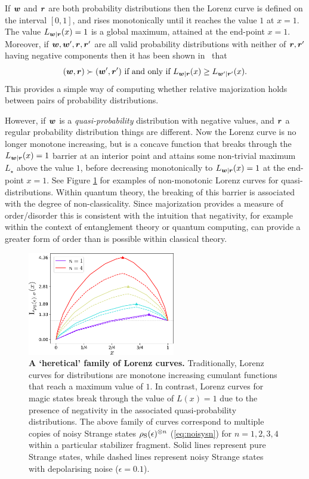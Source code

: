 \documentclass[pra,
aps,
twocolumn,
superscriptaddress,
groupedaddress,
nofootinbib,
reprint
]{revtex4-1}
\begin{document}
If $\boldsymbol{w}$ and $\boldsymbol{r}$ are both probability distributions then the Lorenz curve is defined on the interval $[0,1]$, and rises monotonically until it reaches the value $1$ at $x=1$. The value $L_{\boldsymbol{w}|\boldsymbol{r}}(x) = 1$ is a global maximum, attained at the end-point $x=1$. Moreover, if $\boldsymbol{w}, \boldsymbol{w}', \boldsymbol{r}, \boldsymbol{r}'$ are all valid probability distributions with neither of $\boldsymbol{r},\boldsymbol{r}'$ having negative components then it has been shown in~\cite{ruch_mixing_1978} that
\begin{equation}
(\boldsymbol{w}, \boldsymbol{r}) \succ (\boldsymbol{w}', \boldsymbol{r}') \mbox{ if and only if } L_{\boldsymbol{w} |\boldsymbol{r}}(x) \ge L_{\boldsymbol{w}' |\boldsymbol{r}'}(x).
\end{equation}
This provides a simple way of computing whether relative majorization holds between pairs of probability distributions.

However, if $\boldsymbol{w}$ is a \emph{quasi-probability} distribution with negative values, and $\boldsymbol{r}$ a regular probability distribution things are different. Now the Lorenz curve is no longer monotone increasing, but is a concave function that breaks through the $L_{\boldsymbol{w}|\boldsymbol{r}}(x) = 1$ barrier at an interior point and attains some non-trivial maximum $L_\star$ above the value $1$, before decreasing monotonically to $L_{\boldsymbol{w}|\boldsymbol{r}}(x)= 1$ at the end-point $x=1$. See Figure \ref{fig:lcs} for examples of non-monotonic Lorenz curves for quasi-distributions. Within quantum theory, the breaking of this barrier is associated with the degree of non-classicality. Since majorization provides a measure of order/disorder this is consistent with the intuition that negativity, for example within the context of entanglement theory or quantum computing, can provide a greater form of order than is possible within classical theory.

\begin{figure}
    \centering
    \includegraphics[height=4.5cm]{figs/lc_Strange.pdf}
    \caption{\textbf{A `heretical' family of Lorenz curves.} Traditionally, Lorenz curves for distributions are monotone increasing cumulant functions that reach a maximum value of $1$. In contrast, Lorenz curves for magic states break through the value of $L(x)=1$ due to the presence of negativity in the associated quasi-probability distributions. The above family of curves correspond to multiple copies of noisy Strange states $\rho_{\rm{S}}(\epsilon)^{\otimes n}$ (\cref{eq:noisysn}) for $n=1,2,3,4$ within a particular stabilizer fragment. Solid lines represent pure Strange states, while dashed lines represent noisy Strange states with depolarising noise ($\epsilon = 0.1$).
    }
    \label{fig:lcs}
\end{figure}
\end{document}
